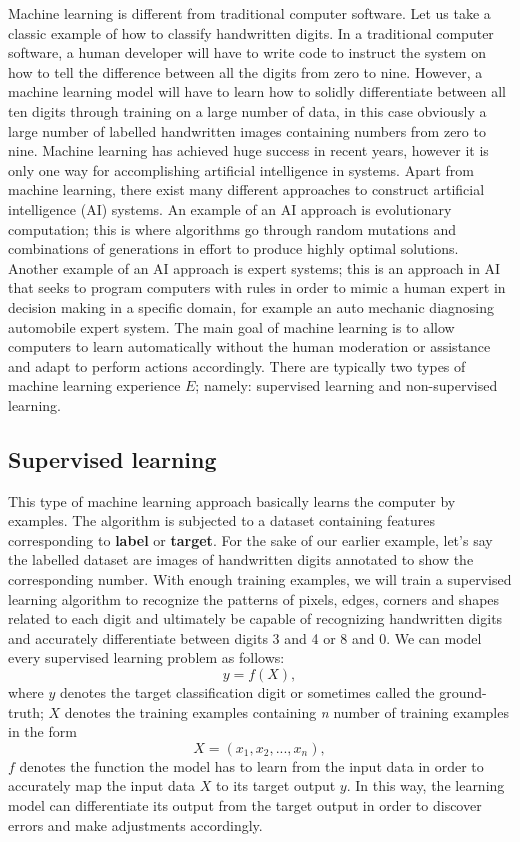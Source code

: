 \documentclass[master]{thesis-uestc}
\begin{document}
Machine learning is different from traditional computer software. Let us take a classic example of how to classify handwritten digits. In a traditional computer software, a human developer will have to write code to instruct the system on how to tell the difference between all the digits from zero to nine. However, a machine learning model will have to learn how to solidly differentiate between all ten digits through training on a large number of data, in this case obviously a large number of labelled handwritten images containing numbers from zero to nine. Machine learning has achieved huge success in recent years, however it is only one way for accomplishing artificial intelligence in systems. Apart from machine learning, there exist many different approaches to construct artificial intelligence (AI) systems. An example of an AI approach is evolutionary computation; this is where algorithms go through random mutations and combinations of generations in effort to produce highly optimal solutions. Another example of an AI approach is expert systems; this is an approach in AI that seeks to program computers with rules in order to mimic a human expert in decision making in a specific domain, for example an auto mechanic diagnosing automobile expert system. The main goal of machine learning is to allow computers to learn automatically without the human moderation or assistance and adapt to perform actions accordingly. There are typically two types of machine learning experience $E$; namely: supervised learning and non-supervised learning.

\subsection{Supervised learning}
This type of machine learning approach basically learns the computer by examples. The algorithm is subjected to a dataset containing features corresponding to \textbf{label} or \textbf{target}. For the sake of our earlier example, let's say the labelled dataset are images of handwritten digits annotated to show the corresponding number. With enough training examples, we will train a supervised learning algorithm to recognize the patterns of pixels, edges, corners and shapes related to each digit and ultimately be capable of recognizing handwritten digits and accurately differentiate between digits 3 and 4 or 8 and 0. We can model every supervised learning problem as follows:
\begin{equation}
y = f (X),
\end{equation}
where $y$ denotes the target classification digit or sometimes called the ground-truth; $X$ denotes the training examples containing \textit{n} number of training examples in the form \[X = (x_1, x_2,...,x_n),\] $f$ denotes the function the model has to learn from the input data in order to accurately map the input data $X$ to its target output $y$. In this way, the learning model can differentiate its output from the target output in order to discover errors and make adjustments accordingly.
\end{document}
